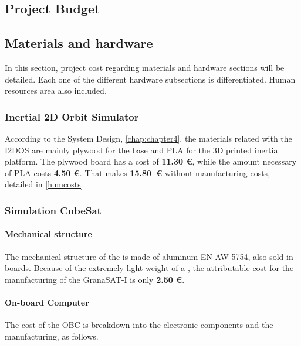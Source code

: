 \begin{appendices}


\chapter{Project Budget} \label{cap:budget}


\section{Materials and hardware}

In this section, project cost regarding materials and hardware sections will be detailed. Each one of the different hardware subsections is differentiated. Human resources area also included.

\subsection{Inertial 2D Orbit Simulator}

According to the System Design, \autoref{chap:chapter4}, the materials related with the \acrshort{I2DOS} are mainly plywood for the base and \acrshort{PLA} for the 3D printed inertial platform. The plywood board has a cost of \textbf{11.30 €}, while the amount necessary of \acrshort{PLA} costs \textbf{4.50 €}. That makes \textbf{15.80~€} without manufacturing costs, detailed in \autoref{humcosts}.


\subsection{Simulation CubeSat}

\subsubsection{Mechanical structure}

The mechanical structure of the  is made of aluminum EN AW 5754, also sold in boards. Because of the extremely light weight of a , the attributable cost for the manufacturing of the GranaSAT-I is only \textbf{2.50 €}.

\subsubsection{On-board Computer}

The cost of the \acrshort{OBC} is breakdown into the electronic components and the manufacturing, as follows.


\end{appendices}
